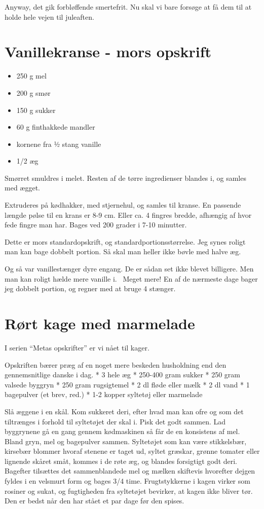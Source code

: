 \documentclass[
  letterpaper,
  DIV=11,
  numbers=noendperiod]{scrreprt}
\providecommand{\tightlist}{%
  \setlength{\itemsep}{0pt}\setlength{\parskip}{0pt}}\usepackage{longtable,booktabs,array}
\begin{document}
Anyway, det gik forbløffende smertefrit. Nu skal vi bare forsøge at få
dem til at holde hele vejen til juleaften.

\hypertarget{vanillekranse---mors-opskrift}{%
\section{Vanillekranse - mors
opskrift}\label{vanillekranse---mors-opskrift}}

\begin{itemize}
\tightlist
\item
  250 g mel
\item
  200 g smør
\item
  150 g sukker
\item
  60 g finthakkede mandler
\item
  kornene fra ½ stang vanille
\item
  1/2 æg
\end{itemize}

Smørret smuldres i melet. Resten af de tørre ingredienser blandes i, og
samles med ægget.

Extruderes på kødhakker, med stjernehul, og samles til kranse. En
passende længde pølse til en krans er 8-9 cm. Eller ca. 4 fingres
bredde, afhængig af hvor fede fingre man har. Bages ved 200 grader i
7-10 minutter.

Dette er mors standardopskrift, og standardportionsstørrelse. Jeg synes
roligt man kan bage dobbelt portion. Så skal man heller ikke bøvle med
halve æg.

Og så var vanillestænger dyre engang. De er sådan set ikke blevet
billigere. Men man kan roligt hælde mere vanille i.~ Meget mere! En af
de nærmeste dage bager jeg dobbelt portion, og regner med at bruge 4
stænger.

\hypertarget{ruxf8rt-kage-med-marmelade}{%
\section{Rørt kage med marmelade}\label{ruxf8rt-kage-med-marmelade}}

I serien ``Metas opskrifter'' er vi nået til kager.

Opskriften bærer præg af en noget mere beskeden husholdning end den
gennemsnitlige danske i dag. * 3 hele æg * 250-400 gram sukker * 250
gram valsede byggryn * 250 gram rugsigtemel * 2 dl fløde eller mælk * 2
dl vand * 1 bagepulver (et brev, red.) * 1-2 kopper syltetøj eller
marmelade

Slå æggene i en skål. Kom sukkeret deri, efter hvad man kan ofre og som
det tiltrænges i forhold til syltetøjet der skal i. Pisk det godt
sammen. Lad byggrynene gå en gang gennem kødmaskinen så får de en
konsistens af mel. Bland gryn, mel og bagepulver sammen. Syltetøjet som
kan være stikkelsbær, kirsebær blommer hvoraf stenene er taget ud,
syltet græskar, grønne tomater eller lignende skåret småt, kommes i de
røte æg, og blandes forsigtigt godt deri. Bagefter tilsættes det
sammenblandede mel og mælken skiftevis hvorefter dejgen fyldes i en
velsmurt form og bages 3/4 time. Frugtstykkerne i kagen virker som
rosiner og sukat, og fugtigheden fra syltetøjet bevirker, at kagen ikke
bliver tør. Den er bedst når den har stået et par dage før den spises.
\end{document}
